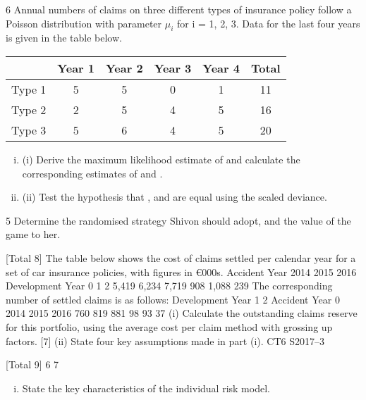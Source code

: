 \documentclass[a4paper,12pt]{article}
\begin{document}
\begin{enumerate}
6
Annual numbers of claims on three different types of insurance policy follow a Poisson distribution with parameter $\mu_i$ for i = 1, 2, 3. Data for the last four years is given in the table below.
\begin{center}
\begin{tabular}{cccccc}
& Year 1 & Year 2 &  Year 3 &  Year 4 & Total \\ \hline
Type 1 & 5 & 5 & 0 & 1 & 11 \\ \hline
Type 2 & 2 & 5 & 4 & 5 & 16 \\ \hline
Type 3 & 5 & 6 & 4 & 5 & 20 \\ \hline
\end{tabular}
\end{center}

\begin{enumerate}[(i)]
\item (i) Derive the maximum likelihood estimate of  and calculate the corresponding estimates of  and  .
\item (ii) Test the hypothesis that  ,  and  are equal using the scaled deviance. 
\end{enumerate}
5
Determine the randomised strategy Shivon should adopt, and the value of the
game to her.

[Total 8]
The table below shows the cost of claims settled per calendar year for a set of car
insurance policies, with figures in €000s.
Accident Year
2014
2015
2016
Development Year
0
1
2
5,419
6,234
7,719
908
1,088
239
The corresponding number of settled claims is as follows:
Development Year
1
2
Accident Year 0
2014
2015
2016 760
819
881
98
93
37
(i) Calculate the outstanding claims reserve for this portfolio, using the average
cost per claim method with grossing up factors.
[7]
(ii) State four key assumptions made in part (i).
CT6 S2017–3

[Total 9]
6 %
7 %
\begin{enumerate}[(i)]
\item State the key characteristics of the individual risk model.


\end{enumerate}
\end{enumerate}
\end{document}
